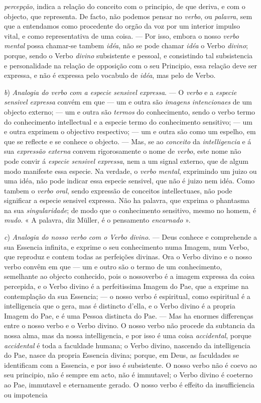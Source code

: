 \emph{percepção}, indica a relação do conceito com o principio, de que deriva, e com o objecto, que representa. De facto, não podemos pensar no \emph{verbo}, ou \emph{palavra}, sem que a entendamos como procedente do orgão da voz por um interior impulso vital, e como representativa de uma coisa. --- Por isso, embora o nosso \emph{verbo mental} possa chamar-se tambem \emph{idéa}, não se pode chamar \emph{idéa} o Verbo \emph{divino}; porque, sendo o Verbo \emph{divino} subsistente e pessoal, e consistindo tal subsistencia e personalidade na relação de opposição com o seu Principio, essa relação deve ser expressa, e não é expressa pelo vocabulo de \emph{idéa}, mas pelo de Verbo.\par \emph{b}) \emph{Analogia do verbo com a especie sensivel expressa}. --- O \emph{verbo} e a \emph{especie sensivel expressa} convém em que --- um e outra são \emph{imagens intencionaes} de um objecto externo; --- um e outra são \emph{termos} do conhecimento, sendo o verbo termo do conhecimento intellectual e a especie termo do conhecimento sensitivo; --- um e outra exprimem o objectivo respectivo; --- um e outra são como um espelho, em que se reflecte e se conhece o objecto. --- Mas, se ao \emph{conceito} da \emph{intelligencia} e á sua \emph{expressão externa} convem rigorosamente o nome de \emph{verbo}, este nome não pode convir á \emph{especie sensivel expressa}, nem a um signal externo, que de algum modo manifeste essa especie. Na verdade, o \emph{verbo mental}, exprimindo um juizo ou uma idéa, não pode indicar essa especie sensivel, que não é juizo nem idéa. Como tambem o \emph{verbo oral}, sendo expressão de conceitos intellectuaes, não pode significar a especie sensivel expressa. Não ha palavra, que exprima o phantasma na sua \emph{singularidade}; de modo que o conhecimento sensitivo, mesmo no homem, é \emph{mudo}. « A palavra, diz Müller, é o pensamento \emph{encarnado} ».\par \emph{c}) \emph{Analogia do nosso verbo com o Verbo divino}. --- Deus conhece e comprehende a sua Essencia infinita, e exprime o seu conhecimento numa Imagem, num Verbo, que reproduz e contem todas as perfeições divinas. Ora o Verbo divino e o nosso verbo convêm em que --- um e outro são o termo de um conhecimento, semelhante ao objecto conhecido, pois o nossoverbo é a imagem expressa da coisa percepida, e o Verbo divino é a perfeitissima Imagem do Pae, que a exprime na contemplação da sua Essencia; --- o nosso verbo é espiritual, como espiritual é a intelligencia que o gera, mas é distincto d'ella, e o Verbo divino é a propria Imagem do Pae, e é uma Pessoa distincta do Pae. --- Mas ha enormes differenças entre o nosso verbo e o Verbo divino. O nosso verbo não procede da subtancia da nossa alma, mas da nossa intelligencia, e por isso é uma coisa \emph{accidental}, porque \emph{accidental} é toda a faculdade humana; o Verbo divino, nascendo da intelligencia do Pae, nasce da propria Essencia divina; porque, em Deus, as faculdades se identificam com a Essencia, e por isso é subsistente. O nosso verbo não é coevo ao seu principio, não é sempre em acto, não é immutavel; o Verbo divino é coeterno ao Pae, immutavel e eternamente gerado. O nosso verbo é effeito da insufficiencia ou impotencia 